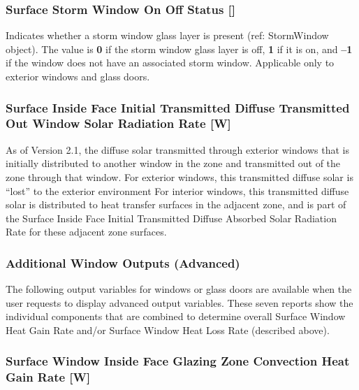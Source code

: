 \subsubsection{Surface Storm Window On Off Status {[]}}\label{surface-storm-window-on-off-status}

Indicates whether a storm window glass layer is present (ref: StormWindow object). The value is \textbf{0} if the storm window glass layer is off, \textbf{1} if it is on, and \textbf{--1} if the window does not have an associated storm window. Applicable only to exterior windows and glass doors.

\subsubsection{Surface Inside Face Initial Transmitted Diffuse Transmitted Out Window Solar Radiation Rate {[}W{]}}\label{surface-inside-face-initial-transmitted-diffuse-transmitted-out-window-solar-radiation-rate-w}

As of Version 2.1, the diffuse solar transmitted through exterior windows that is initially distributed to another window in the zone and transmitted out of the zone through that window. For exterior windows, this transmitted diffuse solar is ``lost'' to the exterior environment For interior windows, this transmitted diffuse solar is distributed to heat transfer surfaces in the adjacent zone, and is part of the Surface Inside Face Initial Transmitted Diffuse Absorbed Solar Radiation Rate for these adjacent zone surfaces.

\subsubsection{Additional Window Outputs (Advanced)}\label{additional-window-outputs-advanced}

The following output variables for windows or glass doors are available when the user requests to display advanced output variables. These seven reports show the individual components that are combined to determine overall Surface Window Heat Gain Rate and/or Surface Window Heat Loss Rate (described above).

\subsubsection{Surface Window Inside Face Glazing Zone Convection Heat Gain Rate {[}W{]}}\label{surface-window-inside-face-glazing-zone-convection-heat-gain-rate-w}


